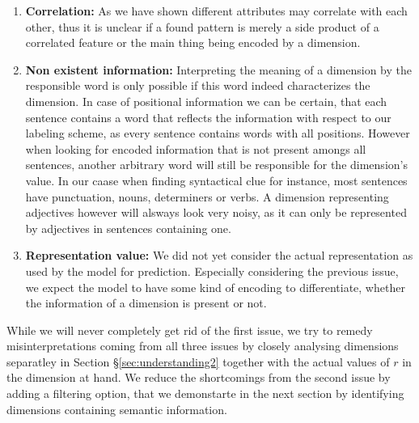 \begin{enumerate}
\item \textbf{Correlation:} As we have shown different attributes may correlate with each other, thus it is unclear if a found pattern is merely a side product of a correlated feature or the main thing being encoded by a dimension.  
\item \textbf{Non existent information:} Interpreting the meaning of a dimension by the responsible word is only possible if this word indeed characterizes the dimension. In case of positional information we can be certain, that each sentence contains a word that reflects the information with respect to our labeling scheme, as every sentence contains words with all positions. However when looking for encoded information that is not present amongs all sentences, another arbitrary word will still be responsible for the dimension's value. In our caase when finding syntactical clue for instance, most sentences have punctuation, nouns, determiners or verbs. A dimension representing adjectives however will alsways look very noisy, as it can only be represented by adjectives in sentences containing one.
\item \textbf{Representation value:} We did not yet consider the actual representation as used by the model for prediction. Especially considering the previous issue, we expect the model to have some kind of encoding to differentiate, whether the information of a dimension is present or not.
\end{enumerate} 
While we will never completely get rid of the first issue, we try to remedy misinterpretations coming from all three issues by closely analysing dimensions separatley in Section §\ref{sec:understanding2} together with the actual values of $r$ in the dimension at hand. We reduce the shortcomings from the second issue by adding a filtering option, that we demonstarte in the next section by identifying dimensions containing semantic information.

